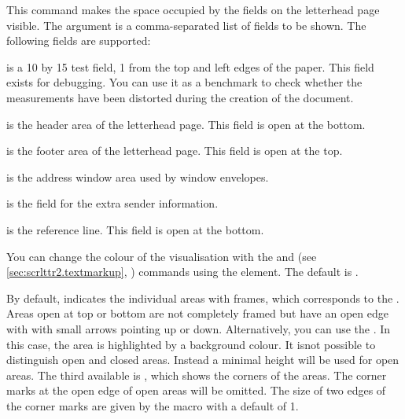 \begin{Declaration}
\end{Declaration}
This command makes the space occupied by the fields on the letterhead page
visible. The  argument is a comma-separated list of fields
to be shown. The following fields are supported:
\begin{labeling}[~--]{}
\item[\PValue{test}] is a 10 by 15 test field, 1
  from the top and left edges of the paper. This field exists for debugging.
  You can use it as a benchmark to check whether the measurements have been
  distorted during the creation of the document.
\item[\PValue{head}] is the header area of the letterhead page. This field
  is open at the bottom.
\item[\PValue{foot}] is the footer area of the letterhead page. This field is
  open at the top.
\item[\PValue{address}] is the address window area used by window envelopes.
\item[\PValue{location}] is the field for the extra sender information.
\item[\PValue{refline}] is the reference line. This field is open at the
  bottom.
\end{labeling}%
%
You can change the colour of the visualisation with
the and 
(see \autoref{sec:scrlttr2.textmarkup},
) commands using the
 element. The default is
.%
%
%
\EndIndexGroup


\begin{Declaration}
\end{Declaration}
By default,  indicates the individual areas with
frames, which corresponds to the 
. Areas open at top or bottom are not completely framed but have
an open edge with with small arrows pointing up or down.
Alternatively, you can use the 
. In this case, the area is highlighted by a background colour.
It isnot possible to distinguish open and closed areas. Instead a minimal
height will be used for open areas. The third
available  is , which shows the corners of the
areas. The corner marks at the open edge of open areas will be omitted. The
size of two edges of the corner marks are given by the  macro
with a default of 1.%
\EndIndexGroup



